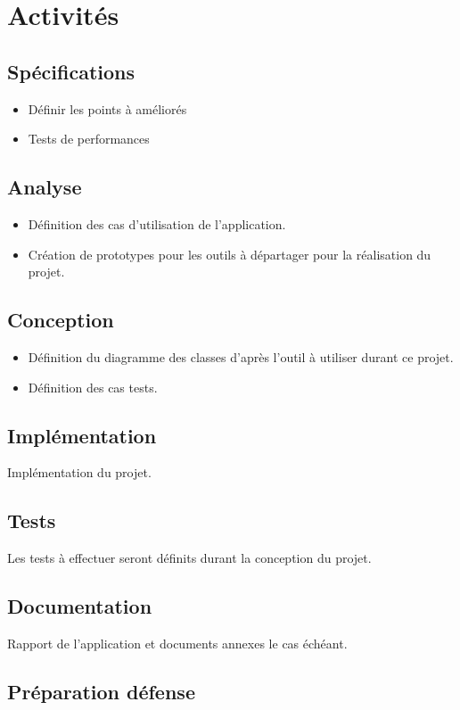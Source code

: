 \documentclass{article}
\begin{document}
\section{Activités}
  \subsection{Spécifications}
    \begin{itemize}
      \item Définir les points à améliorés
      \item Tests de performances
    \end{itemize}
  \subsection{Analyse}
    \begin{itemize}
      \item Définition des cas d'utilisation de l'application.
      \item Création de prototypes pour les outils à départager pour la réalisation du projet.
    \end{itemize}
  \subsection{Conception}
    \begin{itemize}
      \item Définition du diagramme des classes d'après l'outil à utiliser durant ce projet.
      \item Définition des cas tests.
    \end{itemize}
  \subsection{Implémentation}
  Implémentation du projet.
  \subsection{Tests}
  Les tests à effectuer seront définits durant la conception du projet.
  \subsection{Documentation}
  Rapport de l'application et documents annexes le cas échéant.
  \subsection{Préparation défense}
\end{document}
